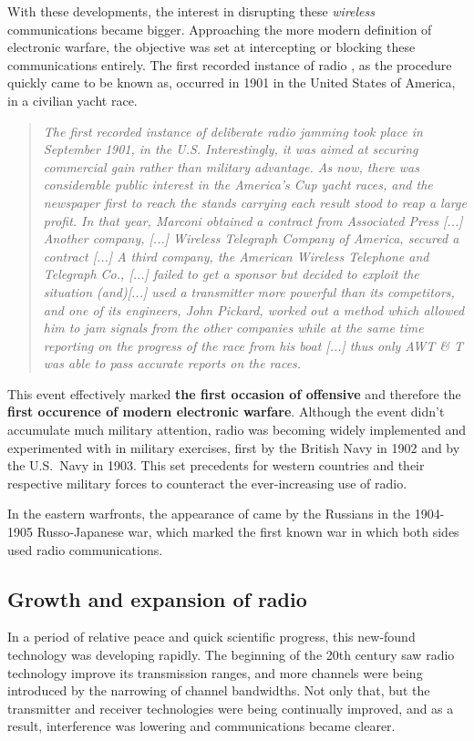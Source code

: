 \documentclass[palatino,english,purist]{ist-report}
\begin{document}
With these developments, the interest in disrupting these \textit{wireless} communications became bigger. Approaching the more modern definition of electronic warfare, the objective was set at intercepting or blocking these communications entirely. The first recorded instance of radio \jamming{}, as the procedure quickly came to be known as, occurred in 1901 in the United States of America, in a civilian yacht race.
\begin{quote}\itshape
    The first recorded instance of deliberate radio jamming took place in
September 1901, in the U.S. Interestingly, it was aimed at securing
commercial gain rather than military advantage. As now, there was
considerable public interest in the America’s Cup yacht races, and the
newspaper first to reach the stands carrying each result stood to reap a
large profit. In that year, Marconi obtained a contract from Associated
Press [...] Another company, [...] Wireless Telegraph Company of America,
secured a contract [...] A third company, the American Wireless Telephone
and Telegraph Co., [...] failed to get a sponsor but decided to exploit the
situation (and)[...] used a transmitter more powerful than its competitors,
and one of its engineers, John Pickard, worked out a method which
allowed him to jam signals from the other companies while at the same
time reporting on the progress of the race from his boat [...] thus only AWT
\& T was able to pass accurate reports on the races. \cite{alican2006}
\end{quote}
This event effectively marked \textbf{the first occasion of offensive \jamming{}} and therefore the \textbf{first occurence of modern electronic warfare}. Although the event didn't accumulate much military attention, radio \jamming{} was becoming widely implemented and experimented with in military exercises, first by the British Navy in 1902 and by the U.S.\ Navy in 1903. This set precedents for western countries and their respective military forces to counteract the ever-increasing use of radio.

In the eastern warfronts, the appearance of \jamming{} came by the Russians in the 1904-1905 Russo-Japanese war, which marked the first known war in which both sides used radio communications.

\subsection{Growth and expansion of radio}

In a period of relative peace and quick scientific progress, this new-found technology was developing rapidly. The beginning of the 20th century saw radio technology improve its transmission ranges, and more channels were being introduced by the narrowing of channel bandwidths. Not only that, but the transmitter and receiver technologies were being continually improved, and as a result, interference was lowering and communications became clearer.
\end{document}
